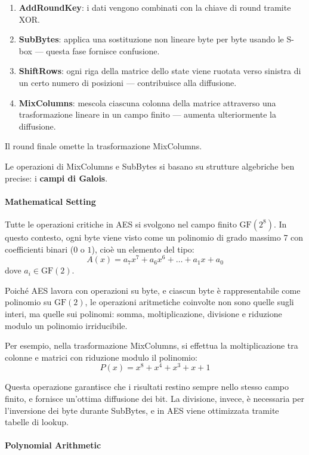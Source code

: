 \documentclass{report}
\begin{document}
\begin{enumerate}
    \item \textbf{AddRoundKey}: i dati vengono combinati con la chiave di round tramite XOR.
    \item \textbf{SubBytes}: applica una sostituzione non lineare byte per byte usando le S-box — questa fase fornisce confusione.
    \item \textbf{ShiftRows}: ogni riga della matrice dello state viene ruotata verso sinistra di un certo numero di posizioni — contribuisce alla diffusione.
    \item \textbf{MixColumns}: mescola ciascuna colonna della matrice attraverso una trasformazione lineare in un campo finito — aumenta ulteriormente la diffusione.
\end{enumerate}

Il round finale omette la trasformazione MixColumns.

Le operazioni di MixColumns e SubBytes si basano su strutture algebriche ben precise: i \textbf{campi di Galois}.

\paragraph{Mathematical Setting}

Tutte le operazioni critiche in AES si svolgono nel campo finito $\text{GF}(2^8)$. In questo contesto, ogni byte viene visto come un polinomio di grado massimo 7 con coefficienti binari ($0$ o $1$), cioè un elemento del tipo:
\[
A(x) = a_7x^7 + a_6x^6 + \dots + a_1x + a_0
\]
dove $a_i \in \text{GF}(2)$.

Poiché AES lavora con operazioni su byte, e ciascun byte è rappresentabile come polinomio su $\text{GF}(2)$, le operazioni aritmetiche coinvolte non sono quelle sugli interi, ma quelle sui polinomi: somma, moltiplicazione, divisione e riduzione modulo un polinomio irriducibile.

Per esempio, nella trasformazione MixColumns, si effettua la moltiplicazione tra colonne e matrici con riduzione modulo il polinomio:
\[
P(x) = x^8 + x^4 + x^3 + x + 1
\]

Questa operazione garantisce che i risultati restino sempre nello stesso campo finito, e fornisce un’ottima diffusione dei bit. La divisione, invece, è necessaria per l’inversione dei byte durante SubBytes, e in AES viene ottimizzata tramite tabelle di lookup.

\paragraph{Polynomial Arithmetic}
\end{document}
